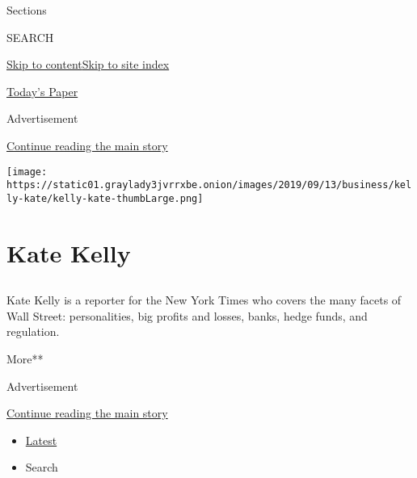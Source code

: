 Sections

SEARCH

\protect\hyperlink{site-content}{Skip to
content}\protect\hyperlink{site-index}{Skip to site index}

\href{https://myaccount.nytimes3xbfgragh.onion/auth/login?response_type=cookie\&client_id=vi}{}

\href{https://www.nytimes3xbfgragh.onion/section/todayspaper}{Today's
Paper}

Advertisement

\protect\hyperlink{after-top}{Continue reading the main story}

\texttt{[image: https://static01.graylady3jvrrxbe.onion/images/2019/09/13/business/kelly-kate/kelly-kate-thumbLarge.png]}

\hypertarget{kate-kelly}{%
\section{Kate Kelly}\label{kate-kelly}}

\subsection{}

Kate Kelly is a reporter for the New York Times who covers the many
facets of Wall Street: personalities, big profits and losses, banks,
hedge funds, and regulation.

More**

Advertisement

\protect\hyperlink{after-mid1}{Continue reading the main story}

\begin{itemize}
\tightlist
\item
  \protect\hyperlink{stream-panel}{Latest}
\item
  Search
\end{itemize}

